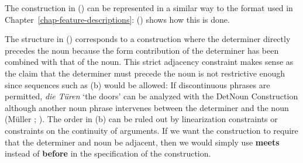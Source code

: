 The construction in () can be represented in a similar way to the format used in
Chapter~\ref{chap-feature-descriptions}: () shows how this
is done.
\begin{figure}
\ea
\label{AVM-DetNoun}
\z
\vspace{-\baselineskip}
\end{figure}%
The structure in () corresponds to a construction where the determiner directly precedes the noun because the form contribution of the determiner
has been combined with that of the noun. This strict adjacency constraint makes sense as the claim that the determiner must precede the noun is not restrictive enough
since sequences such as (b) would be allowed:
\eal
\label{ex-dass-die-frauen-tueren-oeffnen-disc}
\zl
If discontinuous phrases are permitted, \emph{die Türen} `the doors' can be analyzed with the DetNoun Construction although another noun phrase intervenes between the determiner and the noun
(Müller \citeyear[]{Mueller99a}; \citeyear{Mueller99f}). The order in (b) can be ruled out by linearization constraints or constraints on the continuity of arguments.
If we want the construction to require that the determiner and noun be adjacent, then we would simply use \textbf{meets} instead of \textbf{before} in the specification
of the construction.


